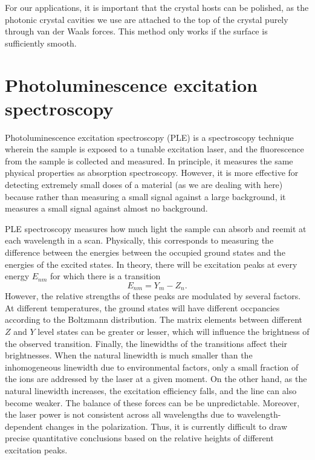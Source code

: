\documentclass[12pt]{report}
\begin{document}
For our applications, it is important that the crystal hosts can be polished, as the photonic crystal cavities we use are attached to the top of the crystal purely through van der Waals forces. This method only works if the surface is sufficiently smooth. 

\section{Photoluminescence excitation spectroscopy}
\label{sec:phot-excit-spectr}

Photoluminescence excitation spectroscopy (PLE) is a spectroscopy technique wherein the sample is exposed to a tunable excitation laser, and the fluorescence from the sample is collected and measured. In principle, it measures the same physical properties as absorption spectroscopy. However, it is more effective for detecting extremely small doses of a material (as we are dealing with here) because rather than measuring a small signal against a large background, it measures a small signal against almost no background.

PLE spectroscopy measures how much light the sample can absorb and reemit at each wavelength in a scan. Physically, this corresponds to measuring the difference between the energies between the occupied ground states and the energies of the excited states. In theory, there will be excitation peaks at every energy $E_{nm}$ for which there is a transition 
\begin{equation}\label{eq:6}
E_{nm} = Y_{m}-Z_{n}.
\end{equation}
However, the relative strengths of these peaks are modulated by several factors. At different temperatures, the ground states will have different occpancies according to the Boltzmann distribution. The matrix elements between different $Z$ and $Y$ level states can be greater or lesser, which will influence the brightness of the observed transition. Finally, the linewidths of the transitions affect their brightnesses. When the natural linewidth is much smaller than the inhomogeneous linewidth due to environmental factors, only a small fraction of the ions are addressed by the laser at a given moment. On the other hand, as the natural linewidth increases, the excitation efficiency falls, and the line can also become weaker. The balance of these forces can be be unpredictable. Moreover, the laser power is not consistent across all wavelengths due to wavelength-dependent changes in the polarization. Thus, it is currently difficult to draw precise quantitative conclusions based on the relative heights of different excitation peaks. 
\end{document}
